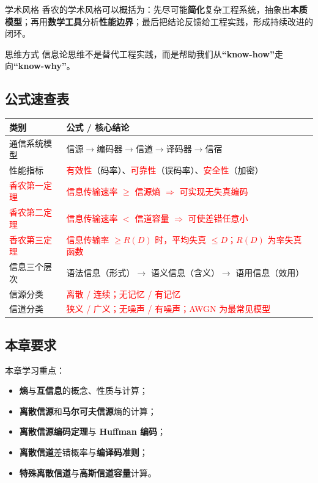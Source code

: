 \begin{keypoint}{学术风格}
香农的学术风格可以概括为：先尽可能\textbf{简化}复杂工程系统，抽象出\textbf{本质模型}；再用\textbf{数学工具}分析\textbf{性能边界}；最后把结论反馈给工程实践，形成持续改进的闭环。
\end{keypoint}

\begin{warningBox}{思维方式}
信息论思维不是替代工程实践，而是帮助我们从\textbf{“know-how”}走向\textbf{“know-why”}。
\end{warningBox}

\subsection{公式速查表}

{\scriptsize
\begin{tabularx}{\textwidth}{@{}l>{\raggedright\arraybackslash}X@{}}
\toprule
\textbf{类别} & \textbf{公式 / 核心结论} \\
\midrule
通信系统模型 & $\text{信源} \to \text{编码器} \to \text{信道} \to \text{译码器} \to \text{信宿}$ \\
\midrule
性能指标   & \textcolor{Red}{有效性}（码率）、\textcolor{Red}{可靠性}（误码率）、\textcolor{Red}{安全性}（加密） \\
\midrule
\textcolor{Red}{香农第一定理} & \textcolor{Red}{信息传输速率 $\ge$ 信源熵 $\Rightarrow$ 可实现无失真编码} \\
\midrule
\textcolor{Red}{香农第二定理} & \textcolor{Red}{信息传输速率 $<$ 信道容量 $\Rightarrow$ 可使差错任意小} \\
\midrule
\textcolor{Red}{香农第三定理} & \textcolor{Red}{信息传输率 $\ge R(D)$ 时，平均失真 $\le D$；$R(D)$ 为率失真函数} \\
\midrule
信息三个层次 & 语法信息（形式）$\to$ 语义信息（含义）$\to$ 语用信息（效用） \\
\midrule
信源分类   & \textcolor{Red}{离散 / 连续；无记忆 / 有记忆} \\
\midrule
信道分类   & \textcolor{Red}{狭义 / 广义；无噪声 / 有噪声；AWGN 为最常见模型} \\
\bottomrule
\end{tabularx}
}

\subsection{本章要求}
本章学习重点：
\begin{itemize}
  \item \textbf{熵}与\textbf{互信息}的概念、性质与计算；
  \item \textbf{离散信源}和\textbf{马尔可夫信源}熵的计算；
  \item \textbf{离散信源编码定理}与 \textbf{Huffman 编码}；
  \item \textbf{离散信道}差错概率与\textbf{编译码准则}；
  \item \textbf{特殊离散信道}与\textbf{高斯信道容量}计算。
\end{itemize}
